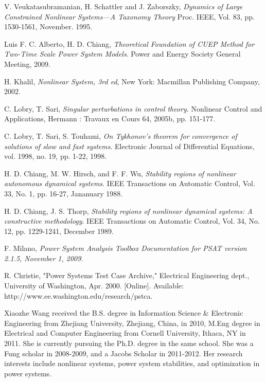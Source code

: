 \documentclass[journal]{IEEEtran}
\begin{document}
\begin{thebibliography}{1}
V.  Veukatasubramanian, H.  Schattler  and  J.  Zaborszky, {\em Dynamics of Large Constrained Nonlinear Systems---A Taxonomy Theory}
\newblock Proc. IEEE, Vol. 83, pp. 1530-1561, November. 1995.

Luis F. C. Alberto, H. D. Chiang, {\em Theoretical Foundation of CUEP Method for Two-Time Scale Power System Models}.
\newblock Power and Energy Society General Meeting, 2009.

H. Khalil, {\em Nonlinear System, 3rd ed},
\newblock New York: Macmillan Publishing Company, 2002.

C. Lobry, T. Sari, {\em Singular perturbations in control theory}.
\newblock Nonlinear Control and Applications, Hermann : Travaux en Cours 64, 2005b, pp. 151-177.

C. Lobry, T. Sari, S. Touhami, {\em On Tykhonov’s theorem for convergence of solutions of slow and fast systems}.
\newblock Electronic Journal of Differential Equations, vol. 1998, no. 19, pp. 1-22, 1998.

H. D. Chiang, M. W. Hirsch, and F. F. Wu, {\em Stability regions of nonlinear autonomous dynamical systems}.
\newblock IEEE Transactions on Automatic Control, Vol. 33, No. 1, pp. 16-27, Jananuary 1988.

H. D. Chiang, J. S. Thorp, {\em Stability regions of nonlinear dynamical systems: A constructive methodology}.
\newblock IEEE Transactions on Automatic Control, Vol. 34, No. 12, pp. 1229-1241, December 1989.

F. Milano, {\em Power System Analysis Toolbox Documentation for PSAT version 2.1.5, November 1, 2009}.

R. Christie, "Power Systems Test Case Archive," Electrical Engineering
dept., University of Washington, Apr. 2000. [Online]. Available:
http://www.ee.washington.edu/research/pstca.

\end{thebibliography}

\begin{IEEEbiography}{Xiaozhe Wang}
received the B.S. degree in Information Science \& Electronic Engineering from Zhejiang University, Zhejiang, China, in 2010, M.Eng degree in Electrical and Computer Engineering from Cornell University, Ithaca, NY in 2011. She is currently pursuing the Ph.D. degree in the same school. She was a Fung scholar in 2008-2009, and a Jacobs Scholar in 2011-2012. Her research interests include nonlinear systems, power system stabilities, and optimization in power systems.
\end{IEEEbiography}
\end{document}
